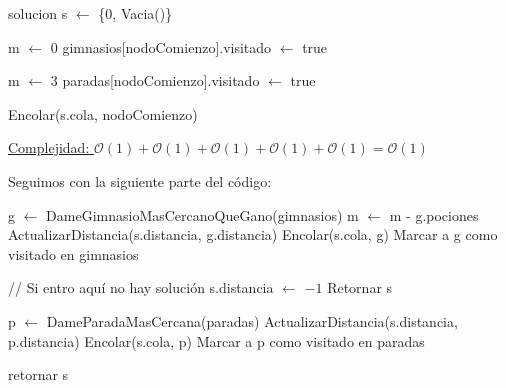 \begin{algorithm}[H]
\label{}
\begin{algorithmic}[]

\State solucion s $\leftarrow$ \{0, Vacia()\} 

 

	\State m $\leftarrow$ 0  
	\State gimnasios[nodoComienzo].visitado $\leftarrow$ true 
\Else

	\State m $\leftarrow$ 3  
	\State paradas[nodoComienzo].visitado $\leftarrow$ true 

\EndIf

\State Encolar(s.cola, nodoComienzo) 

\medskip
\Statex \underline{Complejidad: $\mathcal{O}(1) + \mathcal{O}(1) + \mathcal{O}(1) + \mathcal{O}(1) + \mathcal{O}(1) = \mathcal{O}(1)$}
\end{algorithmic}
\end{algorithm}


Seguimos con la siguiente parte del código:

\begin{algorithm}[H]
\label{}
\begin{algorithmic}[]


		\State g $\leftarrow$ DameGimnasioMasCercanoQueGano(gimnasios)
		\State m $\leftarrow$ m - g.pociones
		\State ActualizarDistancia(s.distancia, g.distancia)
		\State Encolar(s.cola, g)
		\State Marcar a g como visitado en gimnasios

		\State // Si entro aquí no hay solución
		\State s.distancia $\leftarrow$ $-1$
		\State Retornar s
	
	\Else

		\State p $\leftarrow$ DameParadaMasCercana(paradas)
		\State ActualizarDistancia(s.distancia, p.distancia)
		\State Encolar(s.cola, p)
		\State Marcar a p como visitado en paradas

	\EndIf

\EndFor

\State retornar s

\medskip
\Statex \underline{}
\end{algorithmic}
\end{algorithm}


